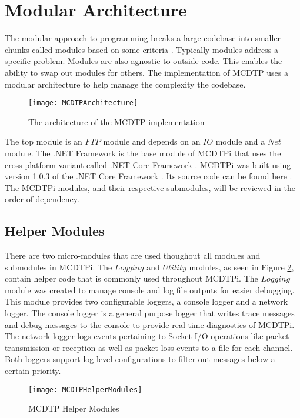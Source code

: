 \section{Modular Architecture}\label{sec:mod-arch}

The modular approach to programming breaks a large codebase into smaller chunks called modules based on some criteria \cite{Microsystems2007}. Typically modules address a specific problem. Modules are also agnostic to outside code. This enables the ability to swap out modules for others. The implementation of MCDTP uses a modular architecture to help manage the complexity the codebase.

\begin{figure}[ht]
\centering
\texttt{[image: MCDTPArchitecture]}
\caption{The architecture of the MCDTP implementation}
\label{fig:mcdtp-arch}
\end{figure}

The top module is an $FTP$ module and depends on an $IO$ module and a $Net$ module. The .NET Framework is the base module of MCDTPi that uses the cross-platform variant called .NET Core Framework \cite{netCore10}. MCDTPi was built using version 1.0.3 of the .NET Core Framework \cite{netCore103}. Its source code can be found here \cite{netCore103Src}. The MCDTPi modules, and their respective submodules, will be reviewed in the order of dependency.

\subsection{Helper Modules}

There are two micro-modules that are used thoughout all modules and submodules in MCDTPi. The $Logging$ and $Utility$ modules, as seen in Figure \ref{fig:mcdtp-hm}, contain helper code that is commonly used throughout MCDTPi. The $Logging$ module was created to manage console and log file outputs for easier debugging. This module provides two configurable loggers, a console logger and a network logger. The console logger is a general purpose logger that writes trace messages and debug messages to the console to provide real-time diagnostics of MCDTPi. The network logger logs events pertaining to Socket I/O operations like packet transmission or reception as well as packet loss events to a file for each channel. Both loggers support log level configurations to filter out messages below a certain priority.

\begin{figure}[ht]
\centering
\texttt{[image: MCDTPHelperModules]}
\caption{MCDTP Helper Modules}
\label{fig:mcdtp-hm}
\end{figure}

